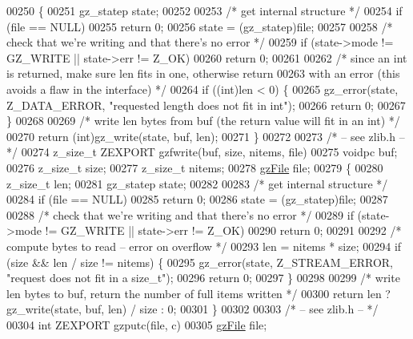 \begin{DoxyCode}
00250 \{
00251     gz\_statep state;
00252 
00253     \textcolor{comment}{/* get internal structure */}
00254     \textcolor{keywordflow}{if} (file == NULL)
00255         \textcolor{keywordflow}{return} 0;
00256     state = (gz\_statep)file;
00257 
00258     \textcolor{comment}{/* check that we're writing and that there's no error */}
00259     \textcolor{keywordflow}{if} (state->mode != GZ\_WRITE || state->err != Z\_OK)
00260         \textcolor{keywordflow}{return} 0;
00261 
00262     \textcolor{comment}{/* since an int is returned, make sure len fits in one, otherwise return}
00263 \textcolor{comment}{       with an error (this avoids a flaw in the interface) */}
00264     \textcolor{keywordflow}{if} ((\textcolor{keywordtype}{int})len < 0) \{
00265         gz\_error(state, Z\_DATA\_ERROR, \textcolor{stringliteral}{"requested length does not fit in int"});
00266         \textcolor{keywordflow}{return} 0;
00267     \}
00268 
00269     \textcolor{comment}{/* write len bytes from buf (the return value will fit in an int) */}
00270     \textcolor{keywordflow}{return} (\textcolor{keywordtype}{int})gz\_write(state, buf, len);
00271 \}
00272 
00273 \textcolor{comment}{/* -- see zlib.h -- */}
00274 z\_size\_t ZEXPORT gzfwrite(buf, size, nitems, file)
00275     voidpc buf;
00276     z\_size\_t size;
00277     z\_size\_t nitems;
00278     \hyperlink{structgz_file__s}{gzFile} file;
00279 \{
00280     z\_size\_t len;
00281     gz\_statep state;
00282 
00283     \textcolor{comment}{/* get internal structure */}
00284     \textcolor{keywordflow}{if} (file == NULL)
00285         \textcolor{keywordflow}{return} 0;
00286     state = (gz\_statep)file;
00287 
00288     \textcolor{comment}{/* check that we're writing and that there's no error */}
00289     \textcolor{keywordflow}{if} (state->mode != GZ\_WRITE || state->err != Z\_OK)
00290         \textcolor{keywordflow}{return} 0;
00291 
00292     \textcolor{comment}{/* compute bytes to read -- error on overflow */}
00293     len = nitems * size;
00294     \textcolor{keywordflow}{if} (size && len / size != nitems) \{
00295         gz\_error(state, Z\_STREAM\_ERROR, \textcolor{stringliteral}{"request does not fit in a size\_t"});
00296         \textcolor{keywordflow}{return} 0;
00297     \}
00298 
00299     \textcolor{comment}{/* write len bytes to buf, return the number of full items written */}
00300     \textcolor{keywordflow}{return} len ? gz\_write(state, buf, len) / size : 0;
00301 \}
00302 
00303 \textcolor{comment}{/* -- see zlib.h -- */}
00304 \textcolor{keywordtype}{int} ZEXPORT gzputc(file, c)
00305     \hyperlink{structgz_file__s}{gzFile} file;

\end{DoxyCode}
